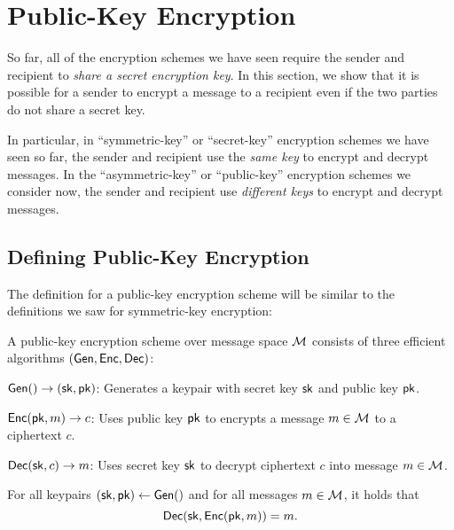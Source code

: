 \chapter{Public-Key Encryption}

So far, all of the encryption schemes we have seen
require the sender and recipient to 
\emph{share a secret encryption key}.
In this section, we show that it is possible for
a sender to encrypt a message to a recipient even
if the two parties do not share a secret key.

In particular, in ``symmetric-key'' or ``secret-key'' encryption
schemes we have seen so far, the sender and recipient use the \emph{same key}
to encrypt and decrypt messages.
In the ``asymmetric-key'' or ``public-key'' encryption schemes
we consider now, the sender and recipient use \emph{different keys}
to encrypt and decrypt messages.

\section{Defining Public-Key Encryption}
The definition for a public-key encryption scheme will be similar to the 
definitions we saw for symmetric-key encryption:

\begin{definition}
	A public-key encryption scheme over message space $\mathcal{M}$ 
  consists of three efficient algorithms $(\mathsf{Gen}, \mathsf{Enc}, \mathsf{Dec})$:
	\begin{compactitem}
    \item $\mathsf{Gen}() \to ({\mathsf{sk}}, \mathsf{pk})$: Generates a keypair with secret key ${\mathsf{sk}}$ and public key $\mathsf{pk}$.
    \item $\mathsf{Enc}(\mathsf{pk}, m) \to c$: Uses public key $\mathsf{pk}$ to encrypts a message $m \in \mathcal{M}$ 
            to a ciphertext $c$.
    \item $\mathsf{Dec}({\mathsf{sk}}, c) \to m$: Uses secret key ${\mathsf{sk}}$ to decrypt ciphertext $c$ into message $m \in \mathcal{M}$.
	\end{compactitem}
\end{definition}

\begin{definition}
For all keypairs $({\mathsf{sk}}, \mathsf{pk}) \gets \mathsf{Gen}()$ and for all messages $m \in \mathcal{M}$,
it holds that $$\mathsf{Dec}({\mathsf{sk}}, \mathsf{Enc}(\mathsf{pk}, m)) = m.$$
\end{definition}

